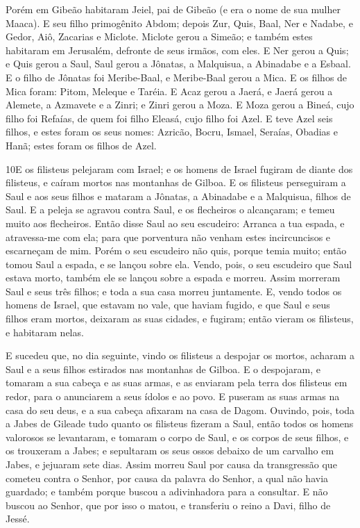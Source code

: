 Porém em Gibeão habitaram Jeiel, pai de Gibeão (e era o nome de
sua mulher Maaca). E seu filho primogênito Abdom; depois Zur,
Quis, Baal, Ner e Nadabe, e Gedor, Aiô, Zacarias e Miclote.
Miclote gerou a Simeão; e também estes habitaram em
Jerusalém, defronte de seus irmãos, com eles. E Ner gerou a
Quis; e Quis gerou a Saul, Saul gerou a Jônatas, a Malquisua, a
Abinadabe e a Esbaal. E o filho de Jônatas foi Meribe-Baal, e
Meribe-Baal gerou a Mica. E os filhos de Mica foram: Pitom,
Meleque e Taréia. E Acaz gerou a Jaerá, e Jaerá gerou a
Alemete, a Azmavete e a Zinri; e Zinri gerou a Moza. E Moza
gerou a Bineá, cujo filho foi Refaías, de quem foi filho Eleasá,
cujo filho foi Azel. E teve Azel seis filhos, e estes foram
os seus nomes: Azricão, Bocru, Ismael, Seraías, Obadias e Hanã;
estes foram os filhos de Azel.

\medskip

\lettrine{10} E os filisteus pelejaram com Israel; e os homens
de Israel fugiram de diante dos filisteus, e caíram mortos nas
montanhas de Gilboa. E os filisteus perseguiram a Saul e aos
seus filhos e mataram a Jônatas, a Abinadabe e a Malquisua, filhos
de Saul. E a peleja se agravou contra Saul, e os flecheiros o
alcançaram; e temeu muito aos flecheiros. Então disse Saul ao
seu escudeiro: Arranca a tua espada, e atravessa-me com ela; para
que porventura não venham estes incircuncisos e escarneçam de mim.
Porém o seu escudeiro não quis, porque temia muito; então tomou Saul
a espada, e se lançou sobre ela. Vendo, pois, o seu escudeiro
que Saul estava morto, também ele se lançou sobre a espada e morreu.
Assim morreram Saul e seus três filhos; e toda a sua casa morreu
juntamente. E, vendo todos os homens de Israel, que estavam no
vale, que haviam fugido, e que Saul e seus filhos eram mortos,
deixaram as suas cidades, e fugiram; então vieram os filisteus, e
habitaram nelas.

E sucedeu que, no dia seguinte, vindo os filisteus a despojar os
mortos, acharam a Saul e a seus filhos estirados nas montanhas de
Gilboa. E o despojaram, e tomaram a sua cabeça e as suas armas,
e as enviaram pela terra dos filisteus em redor, para o anunciarem a
seus ídolos e ao povo. E puseram as suas armas na casa do seu
deus, e a sua cabeça afixaram na casa de Dagom. Ouvindo,
pois, toda a Jabes de Gileade tudo quanto os filisteus fizeram a
Saul, então todos os homens valorosos se levantaram, e
tomaram o corpo de Saul, e os corpos de seus filhos, e os trouxeram
a Jabes; e sepultaram os seus ossos debaixo de um carvalho em Jabes,
e jejuaram sete dias. Assim morreu Saul por causa da
transgressão que cometeu contra o Senhor, por causa da palavra do
Senhor, a qual não havia guardado; e também porque buscou a
adivinhadora para a consultar. E não buscou ao Senhor, que
por isso o matou, e transferiu o reino a Davi, filho de Jessé.

